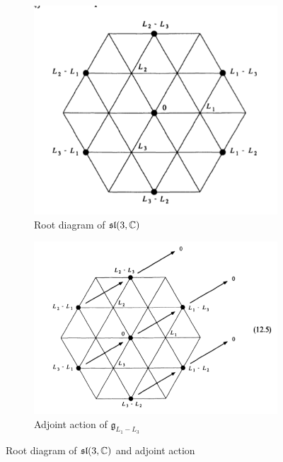 \documentclass{report}
\begin{document}
\begin{figure}[h]
    \centering
    \begin{subfigure}[b]{0.4\textwidth}
        \centering
        \includegraphics[width=\textwidth]{sl_3_C_weight_diagram.png}
        \caption{Root diagram of $\operatorname{{\mathfrak{sl}}}(3, \mathbb C)$}
        \label{fig:root_diagram_sl_3_C_1}
    \end{subfigure}
    \hfill
    \begin{subfigure}[b]{0.525\textwidth}
        \centering
        \includegraphics[width=\textwidth]{sl_3_C_action_weight_diagram.png}
        \caption{Adjoint action of $\mathfrak g_{L_1 - L_3}$}
        \label{fig:root_diagram_sl_3_C_action}
    \end{subfigure}
    \caption{Root diagram of $\operatorname{{\mathfrak{sl}}}(3, \mathbb C)$ and adjoint action}
    \label{fig:root_diagram_sl_3_C}
\end{figure}
\end{document}
